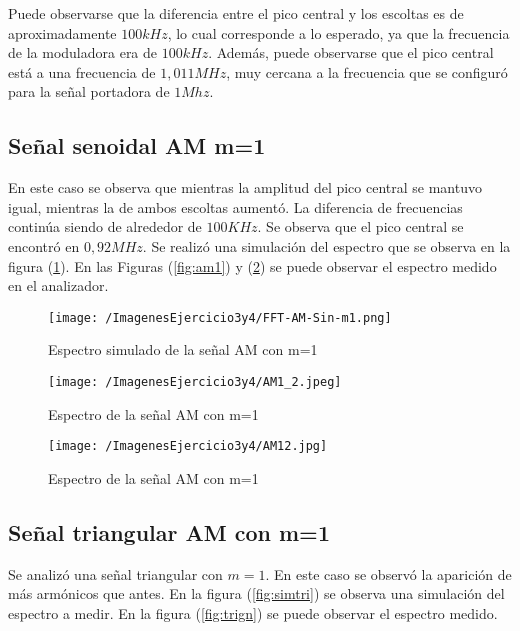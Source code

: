 Puede observarse que la diferencia entre el pico central y los escoltas es de aproximadamente $100 kHz$, lo cual corresponde a lo esperado, ya que la frecuencia de la moduladora era de $100 kHz$. Además, puede observarse que el pico central está a una frecuencia de $1,011 MHz$, muy cercana a la frecuencia que se configuró para la señal portadora de $1 Mhz$.

\subsection{Señal senoidal AM m=1}

En este caso se observa que mientras la amplitud del pico central se mantuvo igual, mientras la de ambos escoltas aumentó. La diferencia de frecuencias continúa siendo de alrededor de $100 KHz$. Se observa que el pico central se encontró en $0,92 MHz$. Se realizó una simulación del espectro que se observa en la figura (\ref{fig:simsin}). En las Figuras (\ref{fig:am1}) y (\ref{fig:am2}) se puede observar el espectro medido en el analizador.

\begin{figure}[H]
	\centering
	\texttt{[image: /ImagenesEjercicio3y4/FFT-AM-Sin-m1.png]}
\caption{Espectro simulado de la señal AM con m=1}
	\label{fig:simsin}
\end{figure}

\begin{figure}[H]
  \centering
  \begin{minipage}[b]{0.6\textwidth}
    \texttt{[image: /ImagenesEjercicio3y4/AM1\_2.jpeg]}
    \caption{Espectro de la señal AM con m=1}
    \label{fig:am1}
  \end{minipage}
  \hfill
  \begin{minipage}[b]{0.6\textwidth}
    \texttt{[image: /ImagenesEjercicio3y4/AM12.jpg]}
    \caption{Espectro de la señal AM con m=1}
    \label{fig:am2}
  \end{minipage}
\end{figure}

\subsection{Señal triangular AM con m=1}
Se analizó una señal triangular con $m=1$. En este caso se observó la aparición de más armónicos que antes. En la figura (\ref{fig:simtri}) se observa una simulación del espectro a medir. En la figura (\ref{fig:trign}) se puede observar el espectro medido.

